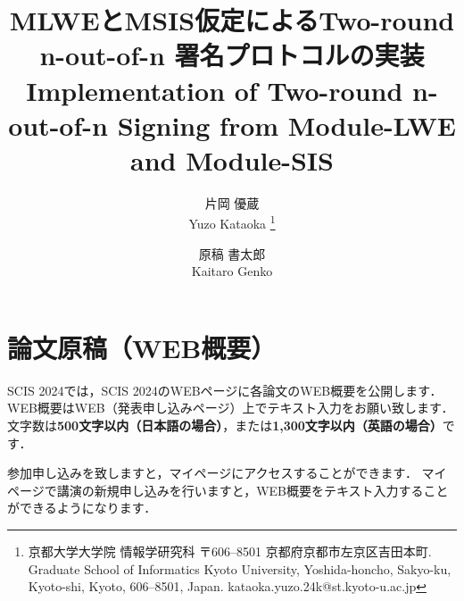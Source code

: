 \documentclass{jarticle} %
\begin{document}
\title{
  MLWEとMSIS仮定によるTwo-round n-out-of-n 署名プロトコルの実装\\
  Implementation of Two-round n-out-of-n Signing from Module-LWE and Module-SIS
}
\author{
  片岡 優蔵
  \\
  Yuzo Kataoka
  \thanks{
    京都大学大学院 情報学研究科 %
    〒606--8501 京都府京都市左京区吉田本町.  %
    Graduate School of Informatics Kyoto University,
    Yoshida-honcho, Sakyo-ku, Kyoto-shi, Kyoto, 606--8501, Japan. %
    kataoka.yuzo.24k@st.kyoto-u.ac.jp}\\
  \and
  原稿 書太郎
  \\
  Kaitaro Genko
}





\maketitle


\section{論文原稿（WEB概要）}
SCIS 2024では，SCIS 2024のWEBページに各論文のWEB概要を公開します．
WEB概要はWEB（発表申し込みページ）上でテキスト入力をお願い致します．
文字数は\textbf{500文字以内（日本語の場合）}，または\textbf{1,300文字以内（英語の場合）}です．

参加申し込みを致しますと，マイページにアクセスすることができます．
マイページで講演の新規申し込みを行いますと，WEB概要をテキスト入力することができるようになります．
\end{document}
